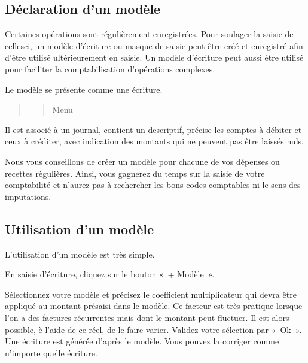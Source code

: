 \documentclass[a4paper,10pt,oneside,french]{sphinxmanual}
\begin{document}
\subsection{Déclaration d’un modèle}
\label{\detokenize{accounting/model:declaration-d-un-modele}}
Certaines opérations sont régulièrement enregistrées. Pour soulager la saisie de celles\sphinxhyphen{}ci, un modèle d’écriture ou masque de saisie peut être créé et enregistré afin d’être utilisé ultérieurement en saisie.
Un modèle d’écriture peut aussi être utilisé pour faciliter la comptabilisation d’opérations complexes.

Le modèle se présente comme une écriture.
\begin{quote}
\begin{quote}

Menu 
\end{quote}

\noindent{}
\end{quote}

Il est associé à un journal, contient un descriptif, précise les comptes à débiter et ceux à créditer, avec indication des montants qui ne peuvent pas être laissés nuls.
\begin{quote}

\noindent{}
\end{quote}

Nous vous conseillons de créer un modèle pour chacune de vos dépenses ou recettes règulières. Ainsi, vous gagnerez du temps sur la saisie de votre comptabilité et n’aurez pas à rechercher les bons codes comptables ni le sens des imputations.


\subsection{Utilisation d’un modèle}
\label{\detokenize{accounting/model:utilisation-d-un-modele}}
L’utilisation d’un modèle est très simple.

En saisie d’écriture, cliquez sur le bouton « + Modèle ».
\begin{quote}

\noindent{}
\end{quote}

Sélectionnez votre modèle et précisez le coefficient multiplicateur qui devra être appliqué au montant présaisi dans le modèle. Ce facteur est très pratique lorsque l’on a des factures récurrentes mais dont le montant peut fluctuer. Il est alors possible, è l’aide de ce réel, de le faire varier.
Validez votre sélection par « Ok ». Une écriture est générée d’après le modèle. Vous pouvez la corriger comme n’importe quelle écriture.
\end{document}
